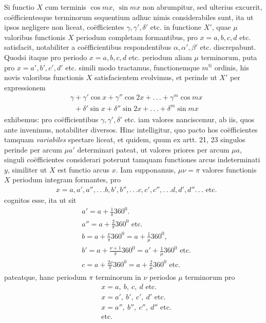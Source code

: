 \begingroup
\renewcommand{\arraystretch}{1.4}
Si functio $X$ cum terminis $\cos mx$, $\sin mx$ non abrumpitur, sed ulterius excurrit, coëfficientesque terminorum sequentium adhuc nimis considerabiles sunt, ita ut ipsos negligere non liceat, coëfficientes $\gamma,\gamma',\delta'$ etc. in functione $X'$, quae $\mu$ valoribus functionis $X$ periodum completam formantibus, pro $x=a,b,c,d$ etc. satisfacit, notabiliter a coëfficientibus respondentibus $\alpha,\alpha',\beta'$ etc. discrepabunt. Quodsi itaque pro periodo $x=a,b,c,d$ etc. periodum aliam $\mu$ terminorum, puta pro $x=a',b',c',d'$ etc. simili modo tractamus, functionemque $m^{\mathrm{ti}}$ ordinis, his novis valoribus functionis $X$ satisfacientem evolvimus, et perinde ut $X'$ per expressionem
\[
\begin{aligned}
&\gamma+\gamma'\cos x+\gamma''\cos2x+.\,.\,.+\gamma^m\cos mx\\[5pt]
&\phantom{\gamma}+\delta'\sin x+\delta''\sin2x+.\,.\,.+\delta^m\sin mx
\end{aligned}
\]
exhibemus: pro coëfficientibus $\gamma,\gamma',\delta'$ etc. iam valores nanciscemur, ab iis, quos ante invenimus, notabiliter diversos. Hinc intelligitur, quo pacto hos coëfficientes tamquam \textit{variabiles} spectare liceat, et quidem, quum ex artt. 21, 23 singulos perinde per arcum $\mu a'$ determinari pateat, ut valores priores per arcum $\mu a$, singuli coëfficientes considerari poterunt tamquam functiones arcus indeterminati $y$, similiter ut $X$ est functio arcus $x$. Iam supponamus, $\mu\nu=\pi$ valores functionis $X$ periodum integram formantes, pro
\[
\begin{aligned}
&x=a,a',a'',.\,.\,.b,b',b'',.\,.\,.c,c',c'',.\,.\,.d,d',d''.\,.\,.\text{ etc.}
\end{aligned}
\]
cognitos esse, ita ut sit
\[
\begin{aligned}
&a'=a+\tfrac1\pi360^0.\\[5pt]
&a''=a+\tfrac2\pi360^0\text{ etc.}\\[5pt]
&b=a+\tfrac\nu\pi360^0=a+\tfrac1\mu360^0,\\[5pt]
&b'=a+\tfrac{\nu+1}\pi360^0=a'+\tfrac1\mu360^0\text{ etc.}\\[5pt]
&c=a+\tfrac{2\nu}\pi360^0=a+\tfrac2\mu360^0\text{ etc.}
\end{aligned}
\]
pateatque, hanc periodum $\pi$ terminorum in $\nu$ periodos $\mu$ terminorum pro
\[
\begin{aligned}
&x=a,\ b,\ c,\ d\text{ etc.}\\[5pt]
&x=a',\ b',\ c',\ d'\text{ etc.}\\[5pt]
&x=a'',\ b'',\ c'',\ d''\text{ etc.}\\[5pt]
&\text{etc.}
\end{aligned}
\]
